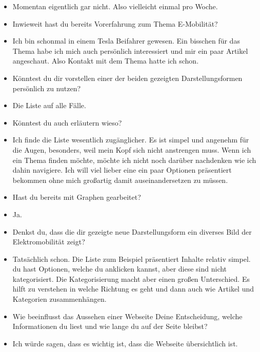 {\begin{itemize}[]
            \item {} Momentan eigentlich gar nicht. Also vielleicht einmal pro Woche.
            \item {} Inwieweit hast du bereits Vorerfahrung zum Thema E-Mobilität?
            \item {} Ich bin schonmal in einem Tesla Beifahrer gewesen.
                  Ein bisschen für das Thema habe ich mich auch persönlich interessiert und mir ein paar Artikel angeschaut.
                  Also Kontakt mit dem Thema hatte ich schon.
            \item {} Könntest du dir vorstellen einer der beiden gezeigten Darstellungsformen persönlich zu nutzen?
            \item {} Die Liste auf alle Fälle.
            \item {} Könntest du auch erläutern wieso?
            \item {} Ich finde die Liste wesentlich zugänglicher.
                  Es ist simpel und angenehm für die Augen, besonders, weil mein Kopf sich nicht anstrengen muss.
                  Wenn ich ein Thema finden möchte, möchte ich nicht noch darüber nachdenken wie ich dahin navigiere.
                  Ich will viel lieber eine ein paar Optionen präsentiert bekommen ohne mich großartig damit auseinandersetzen zu müssen.
            \item {} Hast du bereits mit Graphen gearbeitet?
            \item {} Ja.
            \item {} Denkst du, dass die dir gezeigte neue Darstellungsform ein diverses Bild der Elektromobilität zeigt?
            \item {} Tatsächlich schon. Die Liste zum Beispiel präsentiert Inhalte relativ simpel.
                  du hast Optionen, welche du anklicken kannst, aber diese sind nicht kategorisiert.
                  Die Kategorisierung macht aber einen großen Unterschied.
                  Es hilft zu verstehen in welche Richtung es geht und dann auch wie Artikel und Kategorien zusammenhängen.
            \item {} Wie beeinflusst das Aussehen einer Webseite Deine Entscheidung, welche Informationen du liest und wie lange du auf der Seite bleibst?
            \item {} Ich würde sagen, dass es wichtig ist, dass die Webseite übersichtlich ist.

\end{itemize}}
